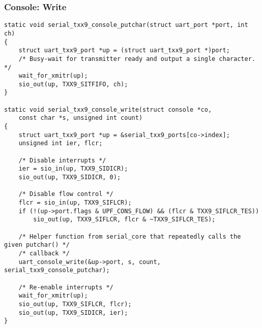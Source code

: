 \begin{frame}[fragile]
  \frametitle{Console: Write}
\begin{verbatim}
static void serial_txx9_console_putchar(struct uart_port *port, int ch)
{
	struct uart_txx9_port *up = (struct uart_txx9_port *)port;
	/* Busy-wait for transmitter ready and output a single character. */
	wait_for_xmitr(up);
	sio_out(up, TXX9_SITFIFO, ch);
}

static void serial_txx9_console_write(struct console *co,
    const char *s, unsigned int count)
{
    struct uart_txx9_port *up = &serial_txx9_ports[co->index];
    unsigned int ier, flcr;
	
    /* Disable interrupts */
    ier = sio_in(up, TXX9_SIDICR);
    sio_out(up, TXX9_SIDICR, 0);
   
    /* Disable flow control */
    flcr = sio_in(up, TXX9_SIFLCR);
    if (!(up->port.flags & UPF_CONS_FLOW) && (flcr & TXX9_SIFLCR_TES))
        sio_out(up, TXX9_SIFLCR, flcr & ~TXX9_SIFLCR_TES);

    /* Helper function from serial_core that repeatedly calls the given putchar() */
    /* callback */
    uart_console_write(&up->port, s, count, serial_txx9_console_putchar);
	
    /* Re-enable interrupts */
    wait_for_xmitr(up);
    sio_out(up, TXX9_SIFLCR, flcr);
    sio_out(up, TXX9_SIDICR, ier);
}
\end{verbatim}
\end{frame}
